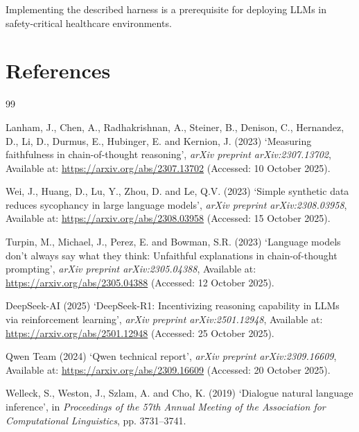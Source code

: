 \documentclass[11pt,a4paper]{article}
\begin{document}
Implementing the described harness is a prerequisite for deploying LLMs in safety-critical healthcare environments.

\newpage
\section*{References}
\begin{thebibliography}{99}

Lanham, J., Chen, A., Radhakrishnan, A., Steiner, B., Denison, C., Hernandez, D., Li, D., Durmus, E., Hubinger, E. and Kernion, J. (2023)
`Measuring faithfulness in chain-of-thought reasoning', \emph{arXiv preprint arXiv:2307.13702}, Available at: \url{https://arxiv.org/abs/2307.13702} (Accessed: 10 October 2025).

Wei, J., Huang, D., Lu, Y., Zhou, D. and Le, Q.V. (2023)
`Simple synthetic data reduces sycophancy in large language models', \emph{arXiv preprint arXiv:2308.03958}, Available at: \url{https://arxiv.org/abs/2308.03958} (Accessed: 15 October 2025).

Turpin, M., Michael, J., Perez, E. and Bowman, S.R. (2023)
`Language models don't always say what they think: Unfaithful explanations in chain-of-thought prompting', \emph{arXiv preprint arXiv:2305.04388}, Available at: \url{https://arxiv.org/abs/2305.04388} (Accessed: 12 October 2025).

DeepSeek-AI (2025)
`DeepSeek-R1: Incentivizing reasoning capability in LLMs via reinforcement learning', \emph{arXiv preprint arXiv:2501.12948}, Available at: \url{https://arxiv.org/abs/2501.12948} (Accessed: 25 October 2025).

Qwen Team (2024)
`Qwen technical report', \emph{arXiv preprint arXiv:2309.16609}, Available at: \url{https://arxiv.org/abs/2309.16609} (Accessed: 20 October 2025).

Welleck, S., Weston, J., Szlam, A. and Cho, K. (2019)
`Dialogue natural language inference', in \emph{Proceedings of the 57th Annual Meeting of the Association for Computational Linguistics}, pp. 3731--3741.


\end{thebibliography}
\end{document}
